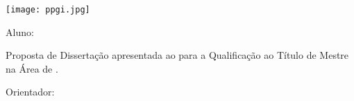 


\begin{titlepage}

\begin{center}
\texttt{[image: ppgi.jpg]}

\par
\vspace{80pt}
{\Huge \titulo}
\par
\vspace{30pt}
{\LARGE Aluno: \nomedoaluno}
\end{center}
\par
\vspace{90pt}
\hspace*{175pt}\parbox{7.6cm}{{\large Proposta de Dissertação apresentada ao \programa para a Qualificação ao Título de Mestre na Área de \areaprograma.}}

\par
\vspace{1em}
\hspace*{175pt}\parbox{7.6cm}{{\large Orientador: \nomedoorientador}}
\par
\vfill
\begin{center}
\textbf{{\large \localidade}\\
{\large \the\year}}
\end{center}
\end{titlepage}
